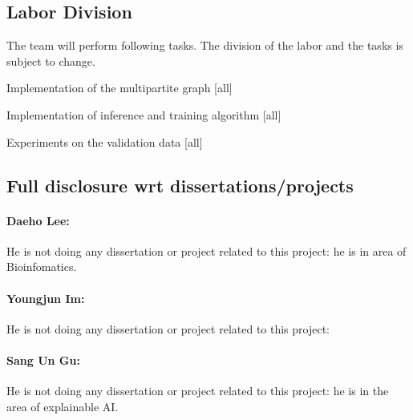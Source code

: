 
\subsection{Labor Division}

The team will perform following tasks. The division of the labor and the tasks is subject to change.
\bit
\item Implementation of the multipartite graph [all]
\item Implementation of inference and training algorithm [all]
\item Experiments on the validation data [all]
\eit

\subsection{Full disclosure wrt dissertations/projects}

\paragraph{Daeho Lee:}
He is not doing any dissertation or project related to this project: he is in area of Bioinfomatics.

\paragraph{Youngjun Im:}
He is not doing any dissertation or project related to this project: 

\paragraph{Sang Un Gu:}
He is not doing any dissertation or project related to this project: he is in the area of explainable AI.

